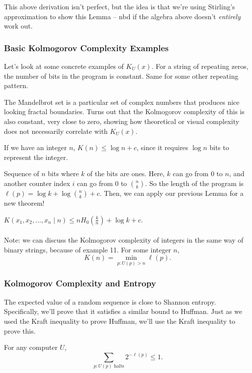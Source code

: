 \documentclass[11pt]{article}
\theoremstyle{definition}
\begin{document}
This above derivation isn't perfect, but the idea is that we're using Stirling's approximation to show this Lemma -- nbd if the algebra above doesn't \textit{entirely} work out.

\subsubsection{Basic Kolmogorov Complexity Examples}

Let's look at some concrete examples of $K_U(x)$. For a string of repeating zeros, the number of bits in the program is constant. Same for some other repeating pattern.

\example The Mandelbrot set is a particular set of complex numbers that produces nice looking fractal boundaries. Turns out that the Kolmogorov complexity of this is also constant, very close to zero, showing how theoretical or visual complexity does not necessarily correlate with $K_U(x)$.

\example If we have an integer $n$, $K(n) \le \log n + c$, since it requires $\log n$ bits to represent the integer.

\example Sequence of $n$ bits where $k$ of the bits are ones. Here, $k$ can go from $0$ to $n$, and another counter index $i$ can go from $0$ to $\binom nk$. So the length of the program is $\ell(p) = \log k + \log \binom nk + c$. Then, we can apply our previous Lemma for a new theorem!

\theorem $K(x_1,x_2,\dots,x_n \mid n) \le nH_0\left(\frac kn\right) + \log k + c$.
\\ \\
\noindent Note: we can discuss the Kolmogorov complexity of integers in the same way of binary strings, because of example 11. For some integer $n$, $$K(n) = \min_{p : U(p) > n} \ell(p).$$

\subsubsection{Kolmogorov Complexity and Entropy}

The expected value of a random sequence is close to Shannon entropy. Specifically, we'll prove that it satisfies a similar bound to Huffman. Just as we used the Kraft inequality to prove Huffman, we'll use the Kraft inequality to prove this.

\theorem For any computer $U$, $$\sum_{p : U(p) \text{ halts}} 2^{-\ell(p)} \le 1.$$

\newpage
\end{document}
